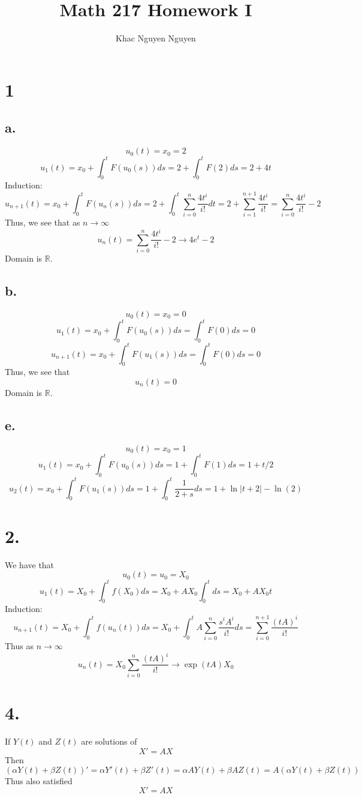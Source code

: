 \documentclass[11pt]{article}
\title{\textbf{Math 217 Homework I}}
\author{Khac Nguyen Nguyen}
\date{}
\theoremstyle{mystyle}
\theoremstyle{definition}
\begin{document}
\section*{1}
\subsection*{a.}
\[
  u_0(t) = x_0 = 2
\]
\[
  u_1(t) = x_0 + \int_0^t F(u_0(s)) ds = 2 + \int_0^t F(2) ds = 2 + 4t 
\]
Induction: 
\[
  u_{n+1}(t) = x_0 + \int_0^t F(u_n(s)) ds = 2 + \int_0^t \sum_{i=0}^n \displaystyle\frac{4t^i}{i!} dt = 2 + \sum_{i=1}^{n+1} \displaystyle\frac{4t^{i}}{i!} = \sum_{i=0}^n  \displaystyle\frac{4t^i}{i!} - 2 
\]
Thus, we see that as $n \to \infty$ 
\[
  u_n(t) = \sum_{i=0}^n  \displaystyle\frac{4t^i}{i!} - 2 \to 4e^t - 2
\]
Domain is $\mathbb{R}$. 
\subsection*{b.}
\[
  u_0(t) = x_0 = 0
\]
\[
  u_1(t) = x_0 + \int_0^t F(u_0(s)) ds = \int_0^t F(0) ds = 0
\]
\[
  u_{n+1}(t) = x_0 + \int_0^t F(u_1(s)) ds = \int_0^t F(0) ds = 0 
\]
Thus, we see that 
\[
  u_n(t) = 0
\]
Domain is $\mathbb{R}$. 
\subsection*{e.}
\[
  u_0(t) = x_0 = 1
\]
\[
  u_1(t) = x_0 + \int_0^t F(u_0(s)) ds = 1 + \int_0^t F(1) ds = 1 + t/2 
\]
\[
  u_2(t) = x_0 + \int_0^t F(u_1(s)) ds = 1 + \int_0^t \displaystyle\frac{1}{2+s} ds = 1 + \ln|t+2| - \ln(2) 
\]
\clearpage
\section*{2.}
We have that 
\[
  u_0(t) = u_0 = X_0
\]
\[
  u_1(t) = X_0 + \int_0^t f(X_0) ds = X_0 + AX_0 \int_0^t ds = X_0 + AX_0 t
\]
Induction:
\[
  u_{n+1}(t) = X_0 + \int_0^t f(u_n(t)) ds = X_0 + \int_0^t A\sum_{i=0}^n \displaystyle\frac{s^i A^i}{i!} ds = \sum_{i=0}^{n+1} \displaystyle\frac{(tA)^i}{i!} 
\]
Thus as $n \to \infty$
\[
  u_n(t) = X_0 \sum_{i=0}^n \displaystyle\frac{(tA)^i}{i!} \to \exp(tA)X_0
\]
\clearpage 
\section*{4.}
If $Y(t)$ and $Z(t)$ are solutions of 
\[
  X' = A X 
\]
Then 
\[
  (\alpha Y(t) + \beta Z(t))' = \alpha Y'(t) + \beta Z'(t) = \alpha AY(t) + \beta AZ(t) = A(\alpha Y(t) + \beta Z(t))
\]
Thus also satisfied 
\[
  X' = AX
\]
\clearpage
\end{document}
